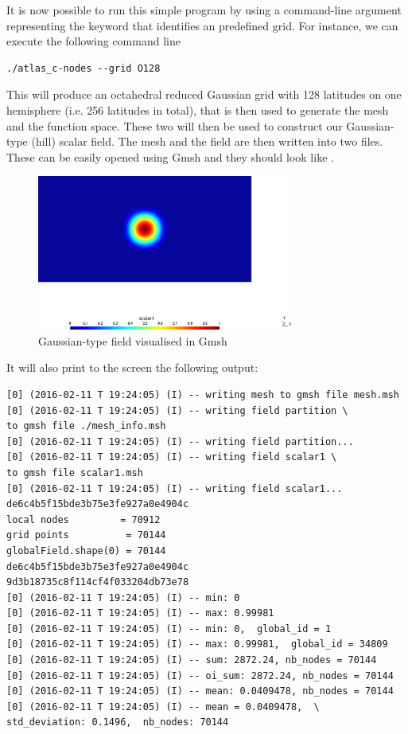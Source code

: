 %
It is now possible to run this simple program by using 
a command-line argument representing the keyword that 
identifies an \Atlas predefined grid.  For instance, 
we can execute the following command line
%
\begin{lstlisting}[style=BashStyle]
./atlas_c-nodes --grid O128
\end{lstlisting}
% 
This will produce an octahedral reduced Gaussian grid 
with 128 latitudes on one hemisphere (i.e. 256 latitudes 
in total), that is then used to generate the mesh and the 
 function space. These two will then be used 
to construct our Gaussian-type (hill) scalar field.
The mesh and the field are then written into two 
files. These can be easily opened using Gmsh and they should 
look like .
%
\begin{figure}%
\centering
\includegraphics[width=0.75\textwidth]{imgs/O128-field.png}
\caption{Gaussian-type field visualised in Gmsh}%
\label{fig:fs_nodes}%
\end{figure}
%
It will also print to the screen the following output:
%
\begin{lstlisting}[style=BashStyle]
[0] (2016-02-11 T 19:24:05) (I) -- writing mesh to gmsh file mesh.msh
[0] (2016-02-11 T 19:24:05) (I) -- writing field partition \
to gmsh file ./mesh_info.msh
[0] (2016-02-11 T 19:24:05) (I) -- writing field partition...
[0] (2016-02-11 T 19:24:05) (I) -- writing field scalar1 \
to gmsh file scalar1.msh
[0] (2016-02-11 T 19:24:05) (I) -- writing field scalar1...
de6c4b5f15bde3b75e3fe927a0e4904c
local nodes         = 70912
grid points          = 70144
globalField.shape(0) = 70144
de6c4b5f15bde3b75e3fe927a0e4904c
9d3b18735c8f114cf4f033204db73e78
[0] (2016-02-11 T 19:24:05) (I) -- min: 0
[0] (2016-02-11 T 19:24:05) (I) -- max: 0.99981
[0] (2016-02-11 T 19:24:05) (I) -- min: 0,  global_id = 1
[0] (2016-02-11 T 19:24:05) (I) -- max: 0.99981,  global_id = 34809
[0] (2016-02-11 T 19:24:05) (I) -- sum: 2872.24, nb_nodes = 70144
[0] (2016-02-11 T 19:24:05) (I) -- oi_sum: 2872.24, nb_nodes = 70144
[0] (2016-02-11 T 19:24:05) (I) -- mean: 0.0409478, nb_nodes = 70144
[0] (2016-02-11 T 19:24:05) (I) -- mean = 0.0409478,  \
std_deviation: 0.1496,  nb_nodes: 70144
\end{lstlisting}
